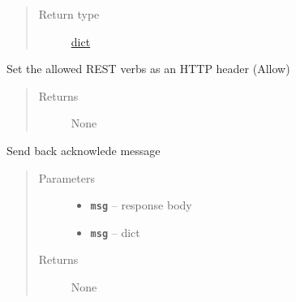 \documentclass[letterpaper,10pt,english]{sphinxmanual}
\begin{document}
\begin{fulllineitems}
\begin{fulllineitems}
\begin{quote}
\begin{description}
\item[{Return type}] \leavevmode
\href{https://docs.python.org/2.7/library/stdtypes.html\#dict}{dict}

\end{description}\end{quote}

\end{fulllineitems}


\begin{fulllineitems}
\label{util/api:escape.util.api.AbstractRequestHandler.send_REST_headers}
Set the allowed REST verbs as an HTTP header (Allow)
\begin{quote}\begin{description}
\item[{Returns}] \leavevmode
None

\end{description}\end{quote}

\end{fulllineitems}


\begin{fulllineitems}
\label{util/api:escape.util.api.AbstractRequestHandler.send_acknowledge}
Send back acknowlede message
\begin{quote}\begin{description}
\item[{Parameters}] \leavevmode\begin{itemize}
\item {} 
\textbf{\texttt{msg}} -- response body

\item {} 
\textbf{\texttt{msg}} -- dict

\end{itemize}

\item[{Returns}] \leavevmode
None

\end{description}\end{quote}

\end{fulllineitems}


\end{fulllineitems}
\end{document}
